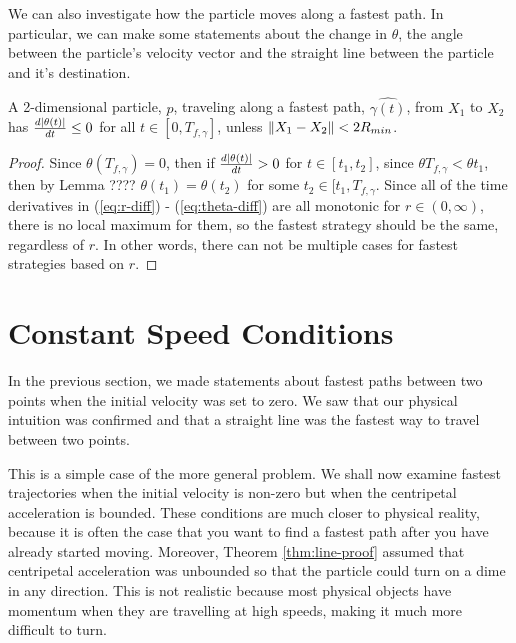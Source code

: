 We can also investigate how the particle moves along a fastest path. In particular, we can make some statements about the change in $\theta$, the angle between the particle's velocity vector and the straight line between the particle and it's destination.

\begin{theorem}
A 2-dimensional particle, $p$, traveling along a fastest path, $\hat{\gamma(t)}$, from $X_1$ to $X_2$ has $\frac{d\abs{\theta(t)}}{dt} \leq 0$ for all $t \in [0, T_{f, \gamma}]$, unless $\norm{X_1 - X_2} < 2 R_{min}$.
\end{theorem}

\begin{proof}
Since $\theta(T_{f,\gamma}) = 0$, then if $\frac{d\abs{\theta(t)}}{dt} > 0$ for $t \in [t_1, t_2]$, since $\theta{T_{f,\gamma}} < \theta{t_1}$, then by Lemma ???? $\theta(t_1) = \theta(t_2)$ for some $t_2 \in [t_1, T_{f, \gamma}$. Since all of the time derivatives in (\ref{eq:r-diff}) - (\ref{eq:theta-diff}) are all monotonic for $r \in (0, \infty)$, there is no local maximum for them, so the fastest strategy should be the same, regardless of $r$. In other words, there can not be multiple cases for fastest strategies based on $r$.
\end{proof}


\section{Constant Speed Conditions}

In the previous section, we made statements about fastest paths between two points when the initial velocity was set to zero. We saw that our physical intuition was confirmed and that a straight line was the fastest way to travel between two points.

This is a simple case of the more general problem. We shall now examine fastest trajectories when the initial velocity is non-zero but when the centripetal acceleration is bounded. These conditions are much closer to physical reality, because it is often the case that you want to find a fastest path after you have already started moving. Moreover, Theorem \ref{thm:line-proof} assumed that centripetal acceleration was unbounded so that the particle could turn on a dime in any direction. This is not realistic because most physical objects have momentum when they are travelling at high speeds, making it much more difficult to turn.

